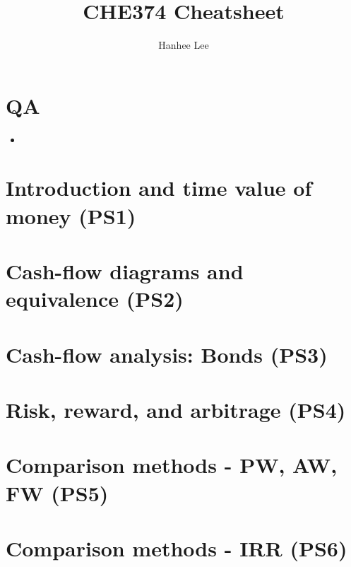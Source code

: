 \documentclass{article}
\title{CHE374 Cheatsheet}
\author{Hanhee Lee}
\begin{document}
\maketitle

\tableofcontents

\listoffigures

\listoftables

\section{QA}
\begin{intuition}
    \begin{itemize}
        \item 
    \end{itemize}
\end{intuition}

\section{Introduction and time value of money (PS1)}

\newpage

\section{Cash-flow diagrams and equivalence (PS2)}

\newpage

\section{Cash-flow analysis: Bonds (PS3)}

\newpage

\section{Risk, reward, and arbitrage (PS4)} %

\newpage

\section{Comparison methods - PW, AW, FW (PS5)}

\newpage

\section{Comparison methods - IRR (PS6)}

\newpage
\end{document}
